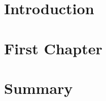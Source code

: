 \chapter{Introduction}\label{chapter:introduction}


\chapter{First Chapter}\label{chapter:first_chapter}


\chapter{Summary}\label{chapter:summary} 


